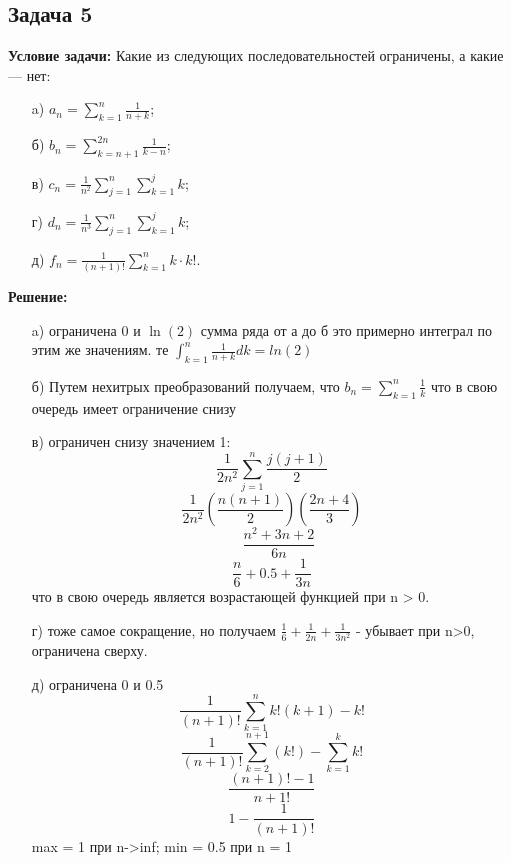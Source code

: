 \documentclass[a4paper,12pt]{article}
\begin{document}
\subsection{Задача 5}
\textbf{Условие задачи:}
Какие из следующих последовательностей ограничены, а какие — нет:
\begin{itemize}
    \item[a)] \(a_n = \sum_{k=1}^{n} \frac{1}{n+k}\);
    \item[б)] \(b_n = \sum_{k=n+1}^{2n} \frac{1}{k-n}\);
    \item[в)] \(c_n = \frac{1}{n^2} \sum_{j=1}^{n} \sum_{k=1}^{j} k\);
    \item[г)] \(d_n = \frac{1}{n^3} \sum_{j=1}^{n} \sum_{k=1}^{j} k\);
    \item[д)] \(f_n = \frac{1}{(n+1)!} \sum_{k=1}^{n} k \cdot k!\).
\end{itemize}
\textbf{Решение:}
\begin{itemize}
    \item[a)] ограничена 0 и $\ln(2)$   сумма ряда от а до б это примерно интеграл по этим же значениям. те $\int_{k=1}^{n}\frac{1}{n+k}dk=ln(2)$
    \item[б)] Путем нехитрых преобразований получаем, что $b_n = \sum_{k=1}^{n}\frac{1}{k}$ что в свою очередь имеет ограничение снизу
    \item[в)] ограничен снизу значением 1:
    \[
    \frac{1}{2n^2}\sum_{j=1}^{n}\frac{j(j+1)}{2}
    \]
    \[
    \frac{1}{2n^2}(\frac{n(n+1)}{2})(\frac{2n+4}{3})
    \]
    \[
    \quad \frac{n^2 + 3n + 2}{6n}
    \]
    \[
    \frac{n}{6} + 0.5 + \frac{1}{3n}
    \]
    что в свою очередь является возрастающей функцией при n > 0.
    \item[г)] тоже самое сокращение, но получаем $\frac{1}{6}+\frac{1}{2n}+\frac{1}{3n^2}$ - убывает при n>0, ограничена сверху.
    \item[д)] ограничена 0 и 0.5
    \[
    \frac{1}{(n+1)!}\sum_{k=1}^{n}k!(k+1)-k!
    \]
    \[
    \frac{1}{(n+1)!}\sum_{k=2}^{n+1}(k!)-\sum_{k=1}^{k}k!
    \]
    \[
    \frac{(n+1)!-1}{n+1!}
    \]
    \[
    1-\frac{1}{(n+1)!}
    \]
    max = 1 при n->inf; min = 0.5 при n = 1
\end{itemize}
\vspace{1cm}
\end{document}

